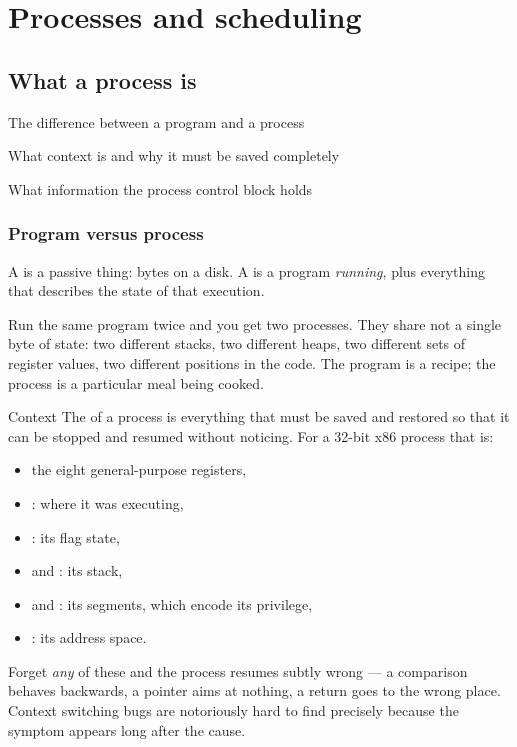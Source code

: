 \part{Processes and scheduling}

\chapter{What a process is}

\begin{goals}
  \item The difference between a program and a process
  \item What context is and why it must be saved completely
  \item What information the process control block holds
\end{goals}

\section{Program versus process}

A  is a passive thing: bytes on a disk. A  is a program \emph{running},
plus everything that describes the state of that execution.

Run the same program twice and you get two processes. They share not a single byte of state: two
different stacks, two different heaps, two different sets of register values, two different
positions in the code. The program is a recipe; the process is a particular meal being cooked.

\begin{concept}{Context}
The  of a process is everything that must be saved and restored so that it can be
stopped and resumed without noticing. For a 32-bit x86 process that is:
\begin{itemize}
  \item the eight general-purpose registers,
  \item {}: where it was executing,
  \item {}: its flag state,
  \item {} and : its stack,
  \item {} and : its segments, which encode its privilege,
  \item {}: its address space.
\end{itemize}
Forget \emph{any} of these and the process resumes subtly wrong --- a comparison behaves
backwards, a pointer aims at nothing, a return goes to the wrong place. Context switching bugs are
notoriously hard to find precisely because the symptom appears long after the cause.
\end{concept}

